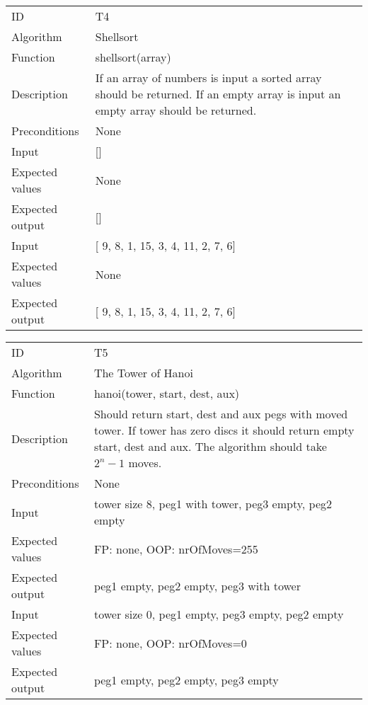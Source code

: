 \documentclass {article}
\begin{document}
\begin{tabular}{ | l p{10cm} | }
\hline
ID & T4 \\
Algorithm & Shellsort \\
Function & shellsort(array) \\
Description & If an array of numbers is input a sorted array should be returned. If an empty array is input an empty array should be returned. \\
Preconditions & None \\
Input & [] \\
Expected values & None \\
Expected output &  [] \\
Input & [ 9, 8, 1, 15, 3, 4, 11, 2, 7, 6] \\
Expected values & None \\
Expected output & [ 9, 8, 1, 15, 3, 4, 11, 2, 7, 6] \\
\hline
\end{tabular}

\begin{tabular}{ | l p{10cm} | }
\hline
ID & T5 \\
Algorithm & The Tower of Hanoi \\
Function &  hanoi(tower, start, dest, aux) \\
Description & Should return start, dest and aux pegs with moved tower. If tower has zero discs it should return empty start, dest and aux. The algorithm should take \(2^n - 1\) moves.\\
Preconditions & None \\
Input & tower size 8, peg1 with tower, peg3 empty, peg2 empty \\
Expected values & FP: none, OOP: nrOfMoves=255 \\
Expected output &  peg1 empty, peg2 empty, peg3 with tower \\
Input & tower size 0, peg1 empty, peg3 empty, peg2 empty \\
Expected values & FP: none, OOP: nrOfMoves=0 \\
Expected output & peg1 empty, peg2 empty, peg3 empty \\
\hline
\end{tabular}
\end{document}
